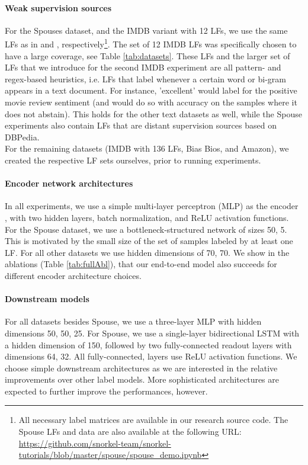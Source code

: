 \documentclass{article}
\begin{document}
\paragraph{Weak supervision sources}
For the Spouses dataset, and the IMDB variant with 12 LFs, we use the same LFs as in \cite{triplets} and \cite{TripletsMean}, respectively\footnote{All necessary label matrices are available in our research source code. The Spouse LFs and data are also available at the following URL:  \url{https://github.com/snorkel-team/snorkel-tutorials/blob/master/spouse/spouse_demo.ipynb}}.
The set of 12 IMDB LFs was specifically chosen to have a large coverage, see Table \ref{tab:datasets}.
These LFs and the larger set of LFs that we introduce for the second IMDB experiment are all pattern- and regex-based heuristics, i.e. LFs that label whenever a certain word or bi-gram appears in a text document. For instance, 'excellent' would label for the positive movie review sentiment (and would do so with  accuracy on the samples where it does not abstain). This holds for the other text datasets as well, while the Spouse experiments also contain LFs that are distant supervision sources based on DBPedia. 
\\
For the remaining datasets (IMDB with 136 LFs, Bias Bios, and Amazon), we created the respective LF sets ourselves, prior to running experiments.

\paragraph{Encoder network architectures}
In all experiments, we use a simple multi-layer perceptron (MLP) as the encoder , with two hidden layers, batch normalization, and ReLU activation functions. 
For the Spouse dataset, we use a bottleneck-structured network of sizes 50, 5. This is motivated by the small size of the set of samples labeled by at least one LF. For all other datasets we use hidden dimensions of 70, 70. We show in the ablations (Table \ref{tab:fullAbl}), that our end-to-end model also succeeds for different encoder architecture choices.
\paragraph{Downstream models}
For all datasets besides Spouse, we use a three-layer MLP with hidden dimensions 50, 50, 25.
For Spouse, we use a single-layer bidirectional LSTM with a hidden dimension of 150, followed by two fully-connected readout layers with dimensions 64, 32.
All fully-connected, layers use ReLU activation functions.
We choose simple downstream architectures as we are interested in the relative improvements over other label models. More sophisticated architectures are expected to further improve the performances, however. 
\end{document}
